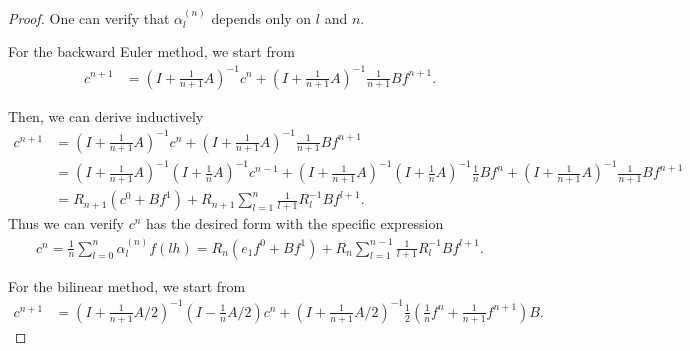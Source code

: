 \documentclass{article}
\theoremstyle{definition}
\newcommand{\pr}[1]{ \left( #1 \right) }
\begin{document}
\begin{proof}
One can verify that $\alpha_l^{(n)}$ depends only on $l$ and $n$. 

For the backward Euler method, we start from
\begin{equation*}
\begin{aligned}
    c^{n+1} 
    &= \pr{ I + \frac{1}{n+1} A  }^{-1} c^{n}
     + \pr{ I + \frac{1}{n+1} A  }^{-1} \frac{1}{n+1} B f^{n+1}.
\end{aligned}
\end{equation*}

Then, we can derive inductively 
\begin{equation*}
    \begin{aligned}
    c^{n+1} 
    &= \pr{ I + \frac{1}{n+1}A }^{-1} c^n + \pr{ I + \frac{1}{n+1}A }^{-1} \frac{1}{n+1}Bf^{n+1} \\
    &= \pr{ I + \frac{1}{n+1}A }^{-1} \pr{ I + \frac{1}{n}A }^{-1} c^{n-1} + \pr{ I + \frac{1}{n+1}A }^{-1} \pr{ I + \frac{1}{n}A }^{-1} \frac{1}{n}Bf^n + \pr{ I + \frac{1}{n+1}A }^{-1} \frac{1}{n+1}Bf^{n+1} \\
    &= R_{n+1} (c^0 + Bf^1) + R_{n+1} \sum_{l=1}^{n} \frac{1}{l+1} R_{l}^{-1} B f^{l+1}.
    \end{aligned}
\end{equation*}
Thus we can verify $c^n$ has the desired form with the specific expression
\begin{equation} \label{eq:back_numsol}
    \begin{aligned}
    c^n 
    = \frac{1}{n} \sum_{l=0}^n \alpha^{(n)}_l f(lh)
    =    R_{n} (e_1f^0 + Bf^1) + R_{n} \sum_{l=1}^{n-1} \frac{1}{l+1} R_{l}^{-1} B f^{l+1}.
    \end{aligned}
\end{equation}

For the bilinear method, we start from
\begin{align*}
    c^{n+1} &= \pr{I + \frac{1}{n+1}A/2}^{-1}\pr{I - \frac{1}{n}A/2}c^n +\pr{I + \frac{1}{n+1}A/2}^{-1} \frac{1}{2} \pr{\frac{1}{n}f^n + \frac{1}{n+1}f^{n+1}}B.
\end{align*}


\end{proof}
\end{document}

